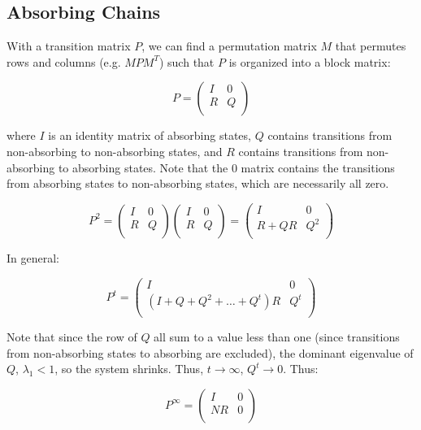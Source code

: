 \documentclass[11pt]{article}
\begin{document}
\subsection{Absorbing Chains}

With a transition matrix $P$, we can find a permutation matrix $M$ that
permutes rows and columns (e.g. $M P M^T$) such that $P$ is organized into a
block matrix:

$$
P = \begin{pmatrix}
  I & 0 \\
  R & Q \\
\end{pmatrix}
$$

where $I$ is an identity matrix of absorbing states, $Q$ contains transitions
from non-absorbing to non-absorbing states, and $R$ contains transitions from
non-absorbing to absorbing states. Note that the $0$ matrix contains the
transitions from absorbing states to non-absorbing states, which are
necessarily all zero.

$$
P^2 = \begin{pmatrix}
  I & 0 \\
  R & Q \\
\end{pmatrix}
\begin{pmatrix}
  I & 0 \\
  R & Q \\
\end{pmatrix} = 
\begin{pmatrix}
  I & 0 \\
  R + QR & Q^2\\
\end{pmatrix}
$$

In general:

$$
P^t = \begin{pmatrix}
  I & 0 \\
  (I + Q + Q^2 + \ldots + Q^t)R & Q^t \\
\end{pmatrix}
$$

Note that since the row of $Q$ all sum to a value less than one (since
transitions from non-absorbing states to absorbing are excluded), the dominant
eigenvalue of $Q$, $\lambda_1 < 1$, so the system shrinks. Thus, $t \rightarrow
\infty$, $Q^t \rightarrow 0$. Thus:


$$
P^\infty = \begin{pmatrix}
  I & 0 \\
  NR & 0 \\
\end{pmatrix}
$$
\end{document}

